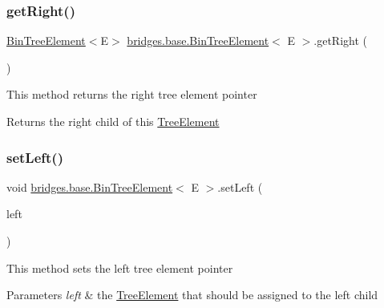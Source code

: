 \subsubsection{\texorpdfstring{get\+Right()}{getRight()}}
{\footnotesize\ttfamily \hyperlink{classbridges_1_1base_1_1_bin_tree_element}{Bin\+Tree\+Element}$<$E$>$ \hyperlink{classbridges_1_1base_1_1_bin_tree_element}{bridges.\+base.\+Bin\+Tree\+Element}$<$ E $>$.get\+Right (\begin{DoxyParamCaption}{ }\end{DoxyParamCaption})}

This method returns the right tree element pointer \begin{DoxyReturn}{Returns}
the right child of this \hyperlink{classbridges_1_1base_1_1_tree_element}{Tree\+Element} 
\end{DoxyReturn}
\hypertarget{classbridges_1_1base_1_1_bin_tree_element_a5bcc2c1374a49f7ab2523ce53d204c30}{}\label{classbridges_1_1base_1_1_bin_tree_element_a5bcc2c1374a49f7ab2523ce53d204c30} 
\subsubsection{\texorpdfstring{set\+Left()}{setLeft()}}
{\footnotesize\ttfamily void \hyperlink{classbridges_1_1base_1_1_bin_tree_element}{bridges.\+base.\+Bin\+Tree\+Element}$<$ E $>$.set\+Left (\begin{DoxyParamCaption}\item[{\hyperlink{classbridges_1_1base_1_1_bin_tree_element}{Bin\+Tree\+Element}$<$ E $>$}]{left }\end{DoxyParamCaption})}

This method sets the left tree element pointer 
\begin{DoxyParams}{Parameters}
{\em left} & the \hyperlink{classbridges_1_1base_1_1_tree_element}{Tree\+Element} that should be assigned to the left child \\
\hline
\end{DoxyParams}
\hypertarget{classbridges_1_1base_1_1_bin_tree_element_abc40e3ed4cfaf4b74aacfd3657e89ebc}{}\label{classbridges_1_1base_1_1_bin_tree_element_abc40e3ed4cfaf4b74aacfd3657e89ebc} 
